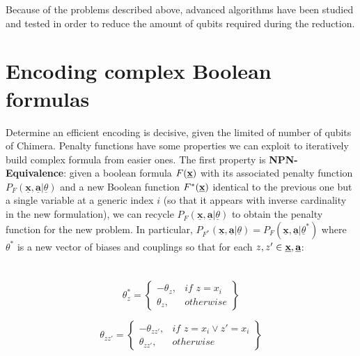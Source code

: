 Because of the problems described above, advanced algorithms have been studied and tested in order to reduce the amount of qubits required during the reduction.



\section{Encoding complex Boolean formulas}

Determine an efficient encoding is decisive, given the limited of number of qubits of Chimera. Penalty functions have some properties we can exploit to iteratively build complex formula from easier ones. The first property is \textbf{NPN-Equivalence}: given a boolean formula $F(\textbf{\underline{x}})$ with its associated penalty function $P_F(\underline{\textbf{x}},\underline{\textbf{a}} | \underline{\theta})$ and a new Boolean function $F^*(\textbf{\underline{x}})$ identical to the previous one but a single variable at a generic index $i$ (so that it appears with inverse cardinality in the new formulation), we can recycle $P_F(\underline{\textbf{x}},\underline{\textbf{a}} | \underline{\theta})$ to obtain the penalty function for the new problem. In particular, $P_{F^*}(\underline{\textbf{x}},\underline{\textbf{a}} | \underline{\theta}) = P_F(\underline{\textbf{x}},\underline{\textbf{a}} | \underline{\theta}^*)$ where $\theta^*$ is a new vector of biases and couplings so that for each $z,z'\in \textbf{\underline{x}},\textbf{\underline{a}}$: \\ \\ \\

\begin{equation}
    \theta_z^* = 
    \left\{
        \begin{array}{lr}
            -\theta_z, & \textit{if }z = x_i \\
            \theta_z, & otherwise
        \end{array}
    \right\}
\end{equation}

\begin{equation}
    \theta_{zz'} = 
    \left\{
        \begin{array}{lr}
            -\theta_{zz'}, & \textit{if }z = x_i \vee z' = x_i\\
            \theta_{zz'}, & otherwise
        \end{array}
    \right\}
\end{equation}


